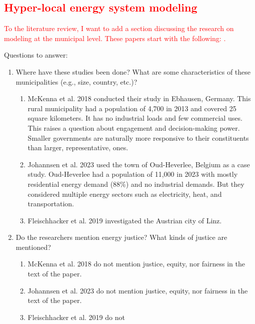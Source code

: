 \textcolor{red}{\subsection{Hyper-local energy system modeling}}
\textcolor{red}{To the literature review, I want to add a section discussing the
research on modeling at the municipal level. These papers start with the
following:
\cite{mckenna_combining_2018,johannsen_municipal_2023,ben_amer_too_2020}.}

Questions to answer:

\begin{enumerate}
    \item Where have these studies been done? What are some characteristics of
    these municipalities (e.g., size, country, etc.)?
    \begin{enumerate}
        \item McKenna et al. 2018 \cite{mckenna_combining_2018} conducted their
        study in Ebhausen, Germany. This rural municipality had a population of
        4,700 in 2013 and covered 25 square kilometers. It has no industrial
        loads and few commercial uses. This raises a question about engagement
        and decision-making power. Smaller governments are naturally more
        responsive to their constituents than larger, representative, ones.
        \item Johannsen et al. 2023 \cite{johannsen_municipal_2023} used the
        town of Oud-Heverlee, Belgium as a case study. Oud-Heverlee had a
        population of 11,000 in 2023 with mostly residential energy demand
        (88\%) and no industrial demands. But they considered multiple energy
        sectors such as electricity, heat, and transportation.
        \item Fleischhacker et al. 2019 \cite{fleischhacker_portfolio_2019}
        investigated the Austrian city of Linz.
    \end{enumerate}
    \item Do the researchers mention energy justice? What kinds of justice are
    mentioned?
    \begin{enumerate}
        \item McKenna et al. 2018 \cite{mckenna_combining_2018} do not mention
        justice, equity, nor fairness in the text of the paper.
        \item Johannsen et al. 2023 \cite{johannsen_municipal_2023} do not
        mention justice, equity, nor fairness in the text of the paper.
        \item Fleischhacker et al. 2019 \cite{fleischhacker_portfolio_2019} do not

\end{enumerate}
\end{enumerate}
